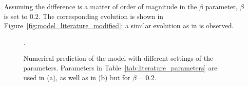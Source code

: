 Assuming the difference is a matter of order of magnitude in the $\beta$ parameter, $\beta$ is set to $0.2$. The corresponding evolution is shown in Figure~\ref{fig:model_literature_modified}: a similar evolution as in \cite{MingLiu} is observed.

\begin{figure}[!ht]\centering
{}
\caption{Numerical prediction of the model with different settings of the parameters. Parameters in Table~\ref{tab:literature_parameters} are used in (a), as well as in (b) but for $\beta=0.2$.}.
\end{figure}